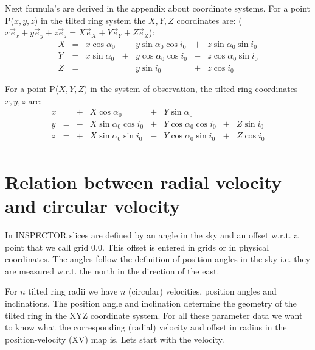 \documentclass[11pt,a4paper]{article}
\begin{document}
Next formula's are derived in the appendix about coordinate systems.
For a point P($x,y,z$) in the tilted ring system the $X,Y,Z$
coordinates are:
($ x \vec e_x + y \vec e_y +z \vec e_z
=  X \vec e_X + Y \vec e_Y +Z \vec e_Z $):
\begin{equation}
\begin{array} {rclclcl}
X & = & x \cos \alpha _0 & - & y \sin \alpha _0 \cos i_0
                         & + & z \sin \alpha _0 \sin i_0 \nonumber \\
Y & = & x \sin \alpha _0 & + & y \cos \alpha _0 \cos i_0
                         & - & z \cos \alpha _0 \sin i_0 \\
Z & = &                  &   & y \sin i_0
                         & + & z \cos i_0 \nonumber
\end{array}
\end{equation}
 
For a point P($X,Y,Z$) in the system of observation, the tilted ring 
coordinates $x,y,z$ are:
\begin{equation}
\begin{array} {rclllllll}
x & = &+& X \cos \alpha _0          & + & Y \sin \alpha _0          &   & \nonumber \\
y & = &-& X \sin \alpha _0 \cos i_0 & + & Y \cos \alpha _0 \cos i_0 & + & Z \sin i_0\\
z & = &+& X \sin \alpha _0 \sin i_0 & - & Y \cos \alpha _0 \sin i_0 & + & Z \cos i_0 \nonumber\\
\label{xyzXYZ}
\end{array}
\end{equation}
 

\section{Relation between radial velocity and circular velocity}
 
In INSPECTOR slices are defined by an angle in the sky and an offset w.r.t. a point that 
we call grid 0,0.
This offset is entered in grids or in physical coordinates. The angles follow
the definition of position angles in the sky i.e. they are measured w.r.t.  the 
north in the direction of the east.

For $n$ tilted ring radii we have $n$ (circular) velocities, 
position angles and inclinations. 
The position angle and inclination determine the geometry of the tilted ring in 
the XYZ coordinate system.
For all these parameter data we want to know what the corresponding 
(radial) velocity and offset in radius in the position-velocity (XV) map is. 
Lets start with the velocity.
\end{document}
